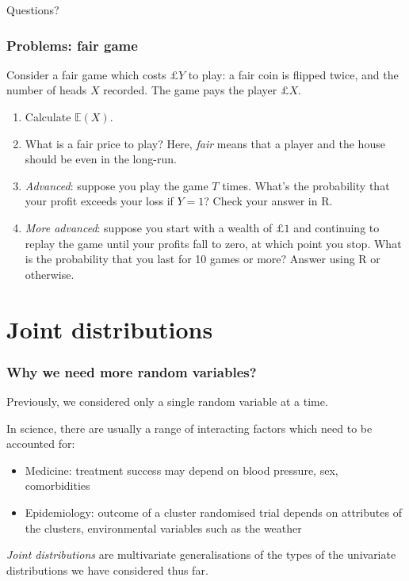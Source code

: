 \documentclass{beamer}
\begin{document}
	\begin{frame}
		\Large Questions?
	\end{frame}
	
	\begin{frame}
		\frametitle{Problems: fair game}
		
		Consider a fair game which costs $\pounds Y$ to play: a fair coin is flipped twice, and the number of heads $X$ recorded. The game pays the player $\pounds X$.
		
		\begin{enumerate}
			\item Calculate $\mathbb{E}(X)$.
			\item What is a fair price to play? Here, \textit{fair} means that a player and the house should be even in the long-run.
			\item \textit{Advanced}: suppose you play the game $T$ times. What's the probability that your profit exceeds your loss if $Y=1$? Check your answer in R.
			\item \textit{More advanced}: suppose you start with a wealth of $\pounds 1$ and continuing to replay the game until your profits fall to zero, at which point you stop. What is the probability that you last for 10 games or more? Answer using R or otherwise.
		\end{enumerate}
		
	\end{frame}

	\section{Joint distributions}
	\frame{\tableofcontents[currentsection]}
	
	\begin{frame}
		\frametitle{Why we need more random variables?}
		
		Previously, we considered only a single random variable at a time.
		
		\vspace{0.5cm}
		
		In science, there are usually a range of interacting factors which need to be accounted for:
		
		\begin{itemize}
			\item Medicine: treatment success may depend on blood pressure, sex, comorbidities
			\item Epidemiology: outcome of a cluster randomised trial depends on attributes of the clusters, environmental variables such as the weather
		\end{itemize}
		
		\textit{Joint distributions} are multivariate generalisations of the types of the univariate distributions we have considered thus far.
		
	\end{frame}
	
\end{document}
